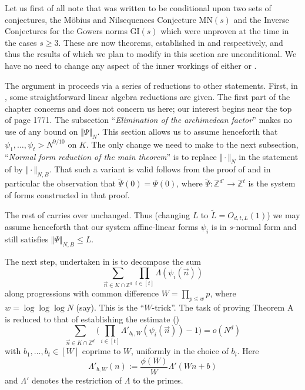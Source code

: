 \documentclass[12pt]{amsart}
\numberwithin{equation}{section}  %
\theoremstyle{remark}
\theoremstyle{plain}
\numberwithin{equation}{section}
\newcommand{\Z}{\mathbb{Z}}
\renewcommand{\leq}{\leqslant}
\renewcommand{\geq}{\geqslant}
\renewcommand{\(}{\left(}
\renewcommand{\)}{\right)}
\newcommand{\vect}[1]{{\ensuremath{\vec{#1}}}}
\begin{document}
 Let us first of all note that \cite{gt-linearprimes} was written to be conditional upon two sets of conjectures, the M\"obius and Nilsequences Conjecture $\mbox{MN}(s)$ and the Inverse Conjectures for the Gowers norms $\mbox{GI}(s)$ which were unproven at the time in the cases $s \geq 3$. These are now theorems, established in \cite{gt-nilmobius} and \cite{GTZ} respectively, and thus the results of \cite{gt-linearprimes} which we plan to modify in this section are unconditional. We have no need to change any aspect of the inner workings of either \cite{gt-nilmobius} or \cite{GTZ}.

The argument in \cite{gt-linearprimes} proceeds via a series of reductions to other statements. First, in \cite[Chapter 4]{gt-linearprimes}, some straightforward linear algebra reductions are given. The first part of the chapter concerns \cite[Theorem 1.8]{gt-linearprimes} and does not concern us here; our interest begins near the top of page 1771. The subsection ``\emph{Elimination of the archimedean factor}'' makes no use of any bound on $\Vert \Psi \Vert_N$. This section allows us to assume henceforth that $\psi_1,\dots,\psi_t > N^{9/10}$ on $K$. The only change we need to make to the next subsection, ``\emph{Normal form reduction of the main theorem}'' is to replace $\Vert \cdot \Vert_N$ in the statement of \cite[Lemma 4.4]{gt-linearprimes} by $\Vert \cdot \Vert_{N, B}$. That such a variant is valid follows from the proof of \cite[Lemma 4.4]{gt-linearprimes} and in particular the observation that $\tilde\Psi(0) = \Psi(0)$, where $\tilde\Psi : \Z^{d'} \rightarrow \Z^t$ is the system of forms constructed in that proof.


The rest of \cite[Chapter 4]{gt-linearprimes} carries over unchanged. Thus (changing $L$ to $\tilde L = O_{d,t,L}(1)$) we may assume henceforth that our system affine-linear forms $\psi_i$ is in $s$-normal form and still satisfies $\Vert \Psi \Vert_{N,B} \leq L$.


The next step, undertaken in \cite[Chapter 5]{gt-linearprimes} is to decompose the sum
\[ \sum_{\vect{n} \in K \cap \Z^d} \prod_{i \in [t]} \Lambda(\psi_i(\vect{n}))\] along progressions with common difference $W = \prod_{p \leq w} p$, where $w = \log \log \log N$ (say). This is the ``$W$-trick''. The task of proving Theorem A is reduced to that of establishing the estimate (\cite[Theorem 5.1]{gt-linearprimes})
\begin{equation*}\label{gt-51} \sum_{\vect{n} \in K \cap \Z^d} \Bigg(\prod_{i \in [t]} \Lambda'_{b_i, W}(\psi_i(\vect{n})) - 1\Bigg) = o(N^d)\end{equation*}
with $b_1,\dots,b_t \in [W]$ coprime to $W$, uniformly in the choice of $b_i$. Here
\[ \Lambda'_{b,W}(n) := \frac{\phi(W)}{W}\Lambda'(Wn + b)\] and $\Lambda'$ denotes the restriction of $\Lambda$ to the primes.
\end{document}
